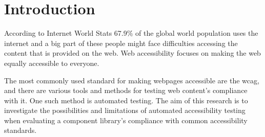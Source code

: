 \documentclass{master_thesis}
\begin{document}
\section{Introduction} \label{chap:intro}




According to Internet World Stats 67.9\% of the global world population uses the internet \citep{MMG2023} and a big part of these people might face difficulties accessing the content that is provided on the web. Web accessibility focuses on making the web equally accessible to everyone.


The most commonly used standard for making webpages accessible are the \acf{wcag}, and there are various tools and methods for testing web content's compliance with it. One such method is automated testing. The aim of this research is to investigate the possibilities and limitations of automated accessibility testing when evaluating a component library's compliance with common accessibility standards.


\end{document}
